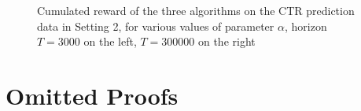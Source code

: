 \begin{APPENDICES}
\begin{figure}[htb]
\begin{centering}
\caption{Cumulated reward of the three algorithms on the CTR prediction data in Setting 2, for various values of parameter $\alpha$, horizon $T=3000$ on the left, $T=300000$ on the right}
\label{fig:plotavcumrewardsetting2}

\end{centering}
\end{figure}





\section{Omitted Proofs}\label{sec:omittedproofs}




\end{APPENDICES}


